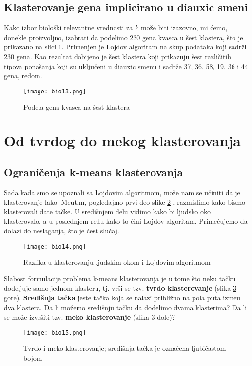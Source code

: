 \subsection{Klasterovanje gena implicirano u diauxic smeni}

Kako izbor biološki relevantne vrednosti za $k$ može biti izazovno, mi ćemo, donekle proizvoljno, izabrati da podelimo 230 gena kvasca u šest klastera, što je prikazano na slici \ref{slika 13}. Primenjen je Lojdov algoritam na skup podataka koji sadrži 230 gena. Kao rezultat dobijeno je šest klastera koji prikazuju šest različitih tipova  ponašanja koji su uključeni u diauxic smenu i sadrže 37, 36, 58, 19, 36 i 44 gena, redom.
\begin{figure}[h!]
    \centering
    \texttt{[image: bio13.png]}
    \caption{Podela gena kvasca na šest klastera}
    \label{slika 13}
\end{figure}

\section{Od tvrdog do mekog klasterovanja}
\subsection{Ograničenja k-means klasterovanja}

Sada kada smo se upoznali sa Lojdovim algoritmom, može nam se učiniti da je klasterovanje lako. Me\dj utim, pogledajmo prvi deo slike \ref{slika 14} i razmislimo kako bismo klasterovali date tačke. U središnjem delu vidimo kako bi ljudsko oko klasterovalo, a u poslednjem redu kako to čini Lojdov algoritam. Primećujemo da dolazi do neslaganja, što je čest slučaj.
\begin{figure}[h!]
    \centering
    \texttt{[image: bio14.png]}
    \caption{Razlika u klasterovanju ljudskim okom i Lojdovim algoritmom}
    \label{slika 14}
\end{figure}

Slabost formulacije problema k-means klasterovanja je u tome što neku tačku dodeljuje samo jednom klasteru, tj. vrši se tzv. \textbf{tvrdo klasterovanje} (slika \ref{slika 15} gore).  \textbf{Središnja tačka} jeste tačka koja se nalazi približno na pola puta izme\dj u dva klastera. Da li možemo središnju tačku da dodelimo dvama klasterima? Da li se može izvršiti tzv. \textbf{meko klasterovanje} (slika \ref{slika 15} dole)? 
\begin{figure}[h!]
    \centering
    \texttt{[image: bio15.png]}
    \caption{Tvrdo i meko klasterovanje; središnja tačka je označena ljubičastom bojom}
    \label{slika 15}
\end{figure}

